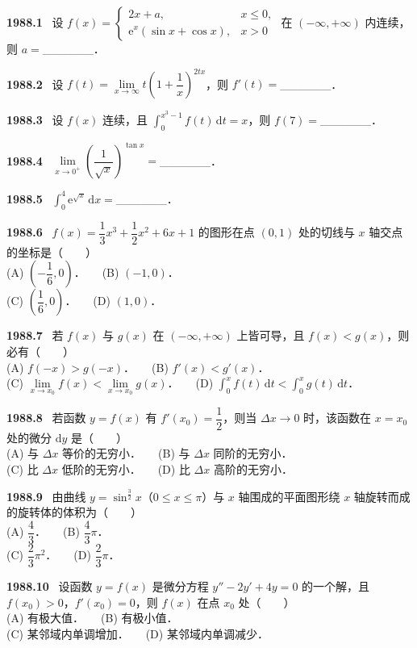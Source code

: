 \documentclass[UTF8,12pt]{ctexart}
\newcommand{\qn}[1]{\textbf{\large #1}\ }
\begin{document}
\qn{1988.1}
设 $f(x)=\begin{cases} 2x+a, & x\leqslant 0, \\ \mathrm{e}^x(\sin x+\cos x), & x>0 \end{cases}$ 在 $(-\infty,+\infty)$ 内连续，则 $a=$______．

\vfill
\newpage
\qn{1988.2}
设 $f(t)=\lim\limits_{x\to\infty}t\left(1+\dfrac{1}{x}\right)^{2tx}$，则 $f'(t)=$______．

\vfill
\newpage
\qn{1988.3}
设 $f(x)$ 连续，且 $\int_0^{x^3-1}f(t)\,\mathrm{d}t=x$，则 $f(7)=$______．

\vfill
\newpage
\qn{1988.4}
$\lim\limits_{x\to0^+}\left(\dfrac{1}{\sqrt{x}}\right)^{\tan x}=$______．

\vfill
\newpage
\qn{1988.5}
$\int_0^4\mathrm{e}^{\sqrt{x}}\,\mathrm{d}x=$______．

\vfill
\newpage
\qn{1988.6}
$f(x)=\dfrac{1}{3}x^3+\dfrac{1}{2}x^2+6x+1$ 的图形在点 $(0,1)$ 处的切线与 $x$ 轴交点的坐标是（　　）
\\
\noindent (A) $\left(-\dfrac{1}{6},0\right)$．　　(B) $(-1,0)$．
\\
\noindent (C) $\left(\dfrac{1}{6},0\right)$．　　(D) $(1,0)$．

\vfill
\newpage
\qn{1988.7}
若 $f(x)$ 与 $g(x)$ 在 $(-\infty,+\infty)$ 上皆可导，且 $f(x)<g(x)$，则必有（　　）
\\
\noindent (A) $f(-x)>g(-x)$．　　(B) $f'(x)<g'(x)$．
\\
\noindent (C) $\lim\limits_{x\to x_0}f(x)<\lim\limits_{x\to x_0}g(x)$．　　(D) $\int_0^x f(t)\,\mathrm{d}t<\int_0^x g(t)\,\mathrm{d}t$．

\vfill
\newpage
\qn{1988.8}
若函数 $y=f(x)$ 有 $f'(x_0)=\dfrac{1}{2}$，则当 $\Delta x\to0$ 时，该函数在 $x=x_0$ 处的微分 $\mathrm{d}y$ 是（　　）
\\
\noindent (A) 与 $\Delta x$ 等价的无穷小．　　(B) 与 $\Delta x$ 同阶的无穷小．
\\
\noindent (C) 比 $\Delta x$ 低阶的无穷小．　　(D) 比 $\Delta x$ 高阶的无穷小．

\vfill
\newpage
\qn{1988.9}
由曲线 $y=\sin^{\frac{3}{2}}x$（$0\leqslant x\leqslant\pi$）与 $x$ 轴围成的平面图形绕 $x$ 轴旋转而成的旋转体的体积为（　　）
\\
\noindent (A) $\dfrac{4}{3}$．　　(B) $\dfrac{4}{3}\pi$．
\\
\noindent (C) $\dfrac{2}{3}\pi^2$．　　(D) $\dfrac{2}{3}\pi$．

\vfill
\newpage
\qn{1988.10}
设函数 $y=f(x)$ 是微分方程 $y''-2y'+4y=0$ 的一个解，且 $f(x_0)>0$，$f'(x_0)=0$，则 $f(x)$ 在点 $x_0$ 处（　　）
\\
\noindent (A) 有极大值．　　(B) 有极小值．
\\
\noindent (C) 某邻域内单调增加．　　(D) 某邻域内单调减少．
\end{document}
